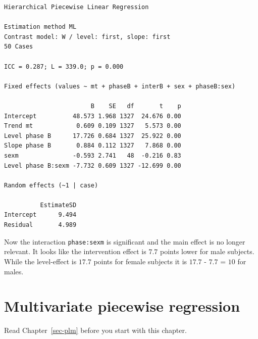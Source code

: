 \documentclass[
  letterpaper,
  DIV=11,
  numbers=noendperiod]{scrreprt}
\begin{document}
\begin{verbatim}
Hierarchical Piecewise Linear Regression

Estimation method ML 
Contrast model: W / level: first, slope: first
50 Cases

ICC = 0.287; L = 339.0; p = 0.000

Fixed effects (values ~ mt + phaseB + interB + sex + phaseB:sex)

                        B    SE   df       t    p
Intercept          48.573 1.968 1327  24.676 0.00
Trend mt            0.609 0.109 1327   5.573 0.00
Level phase B      17.726 0.684 1327  25.922 0.00
Slope phase B       0.884 0.112 1327   7.868 0.00
sexm               -0.593 2.741   48  -0.216 0.83
Level phase B:sexm -7.732 0.609 1327 -12.699 0.00

Random effects (~1 | case)

          EstimateSD
Intercept      9.494
Residual       4.989
\end{verbatim}

Now the interaction \texttt{phase:sexm} is significant and the main
effect is no longer relevant. It looks like the intervention effect is
\(7.7\) points lower for male subjects. While the level-effect is
\(17.7\) points for female subjects it is \(17.7\) - \(7.7\) = \(10\)
for males.

\hypertarget{sec-mplm}{%
\chapter{Multivariate piecewise regression}\label{sec-mplm}}

\begin{tcolorbox}[enhanced jigsaw, breakable, toptitle=1mm, colframe=quarto-callout-note-color-frame, arc=.35mm, titlerule=0mm, coltitle=black, rightrule=.15mm, bottomtitle=1mm, bottomrule=.15mm, colbacktitle=quarto-callout-note-color!10!white, title=\textcolor{quarto-callout-note-color}{\faInfo}\hspace{0.5em}{Note}, colback=white, opacitybacktitle=0.6, opacityback=0, leftrule=.75mm, toprule=.15mm, left=2mm]

Read Chapter~\ref{sec-plm} before you start with this chapter.

\end{tcolorbox}
\end{document}
